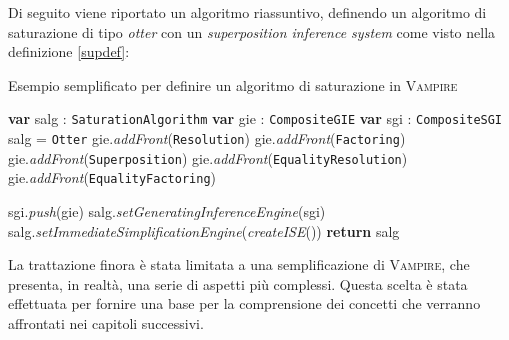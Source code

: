\begin{example}
    Di seguito viene riportato un algoritmo riassuntivo, definendo un algoritmo di saturazione di tipo \emph{otter} con un \emph{superposition inference system} come visto 
nella definizione \ref{supdef}:
\begin{algorithm}
    \caption{Esempio semplificato per definire un algoritmo di saturazione in \textsc{Vampire}}
    \begin{algorithmic}
        \State \textbf{var} salg : \verb|SaturationAlgorithm|
        \State \textbf{var} gie : \verb|CompositeGIE|
        \State \textbf{var} sgi : \verb|CompositeSGI|
        \State salg = \verb|Otter|
        \State gie.\emph{addFront}(\verb|Resolution|)
        \State gie.\emph{addFront}(\verb|Factoring|)
        \State gie.\emph{addFront}(\verb|Superposition|)
        \State gie.\emph{addFront}(\verb|EqualityResolution|)
        \State gie.\emph{addFront}(\verb|EqualityFactoring|)

        \State sgi.\emph{push}(gie)
        \State salg.\emph{setGeneratingInferenceEngine}(sgi)
        \State salg.\emph{setImmediateSimplificationEngine}(\emph{createISE}())
        \State \textbf{return} salg
        \EndFunction
    \end{algorithmic}
\end{algorithm}
\end{example}
La trattazione finora è stata limitata a una semplificazione di \textsc{Vampire}, che presenta, in realtà, una 
serie di aspetti più complessi. Questa scelta è stata effettuata per fornire una base 
per la comprensione dei concetti che verranno affrontati nei capitoli successivi. 
\clearpage
